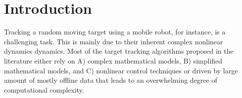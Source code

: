 \documentclass[conference]{IEEEtran}
\begin{document}

\section{Introduction}
\label{sec:introduction}

Tracking a random moving target using a mobile robot, for instance, is a challenging task. This is mainly due to their inherent complex nonlinear dynamics dynamics. Most of the target tracking algorithms proposed in the literature either rely on A) complex mathematical models, B) simplified mathematical models, and C) nonlinear control techniques or driven by large amount of mostly offline data that leads to an overwhelming degree of computational complexity.
\end{document}
